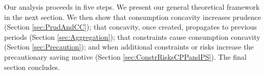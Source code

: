 Our analysis proceeds in five steps. We present our general theoretical framework in the next section. We then show that consumption concavity increases prudence (Section \ref{sec:PrudAndCC}); that concavity, once created, propagates to previous periods (Section \ref{sec:Aggregation}); that constraints cause consumption concavity (Section \ref{sec:Precaution}); and when additional constraints or risks increase the precautionary saving motive (Section \ref{sec:ConstrRisksCPPandPS}). The final section concludes.

%
%

